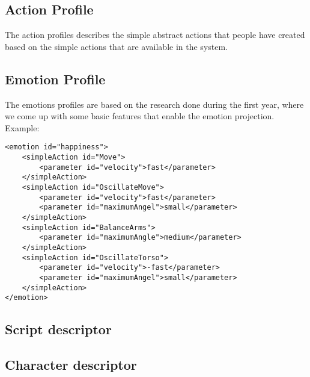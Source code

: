 \subsection{Action Profile}
The action profiles describes the simple abstract actions that people have created based on the simple actions that are available in the system. 
\subsection{Emotion Profile}
The emotions profiles are based on the research done during the first year, where we come up with some basic features that enable the emotion projection. Example:
\begin{verbatim}
<emotion id="happiness">
    <simpleAction id="Move">
		<parameter id="velocity">fast</parameter>    
    </simpleAction>
    <simpleAction id="OscillateMove">
        <parameter id="velocity">fast</parameter>
        <parameter id="maximumAngel">small</parameter>
    </simpleAction>
    <simpleAction id="BalanceArms">
        <parameter id="maximumAngle">medium</parameter>    
    </simpleAction>
    <simpleAction id="OscillateTorso">
        <parameter id="velocity">-fast</parameter>
        <parameter id="maximumAngel">small</parameter>
    </simpleAction>
</emotion>
\end{verbatim}
\subsection{Script descriptor}
\subsection{Character descriptor}
